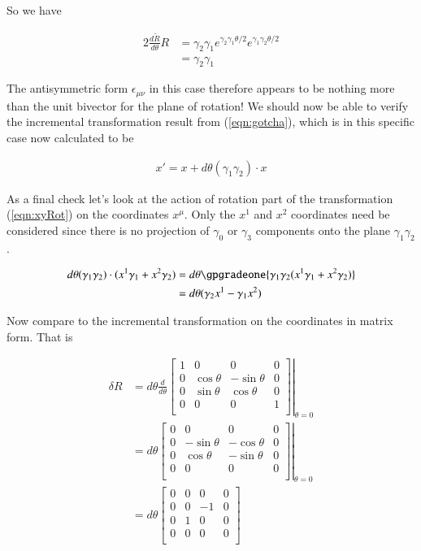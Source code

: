 \documentclass{article}
\begin{document}
So we have

\begin{align*}
2 \frac{d\tilde{R}}{d\theta} R 
&= \gamma_2 \gamma_1 e^{\gamma_2\gamma_1 \theta/2} e^{\gamma_1\gamma_2 \theta/2} \\
&= \gamma_2 \gamma_1 
\end{align*}

The antisymmetric form $\epsilon_{\mu\nu}$ in this case therefore appears to be nothing more than the unit bivector for the plane of rotation!  We should now be able to verify
the incremental transformation result from (\ref{eqn:gotcha}), which is in this specific case now calculated to be

\begin{align}\label{eqn:xyRot}
x'= x + d\theta (\gamma_1 \gamma_2) \cdot x
\end{align}

As a final check let's look at the action of rotation part of the transformation (\ref{eqn:xyRot}) on the coordinates $x^\mu$.  Only the $x^1$ and $x^2$ coordinates need be considered since there is no projection of $\gamma_0$ or $\gamma_3$ components onto the plane $\gamma_1 \gamma_2$.

\begin{align*}
d\theta (\gamma_1 \gamma_2) \cdot (x^1 \gamma_1 + x^2 \gamma_2)
&= 
d\theta \gpgradeone{ \gamma_1 \gamma_2 (x^1 \gamma_1 + x^2 \gamma_2) } \\
&= 
d\theta (\gamma_2 x^1 - \gamma_1 x^2)  \\
\end{align*}

Now compare to the incremental transformation on the coordinates in matrix form.  That is

\begin{align*}
\delta R
&=
d\theta \frac{d}{d\theta}
{
\left.
\begin{bmatrix}
1 & 0 & 0 & 0 \\
0 & \cos\theta & -\sin\theta & 0 \\
0 & \sin\theta & \cos\theta & 0 \\
0 & 0 & 0 & 1 \\
\end{bmatrix}
\right\vert}_{\theta=0} \\
&=
d\theta
{
\left.
\begin{bmatrix}
0 & 0 & 0 & 0 \\
0 & -\sin\theta & -\cos\theta & 0 \\
0 & \cos\theta & -\sin\theta & 0 \\
0 & 0 & 0 & 0 \\
\end{bmatrix}
\right\vert}_{\theta=0} \\
&=
d\theta
\begin{bmatrix}
0 & 0 & 0 & 0 \\
0 & 0 & -1 & 0 \\
0 & 1 & 0 & 0 \\
0 & 0 & 0 & 0 \\
\end{bmatrix} \\
\end{align*}
\end{document}
